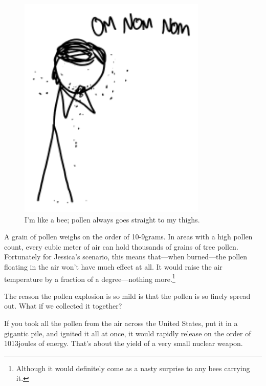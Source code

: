 {\begin{figure}[!htbp]
\centering
\includegraphics[scale=0.5, max width=0.8\textwidth]{imgs/a/97/eating.png}
\caption{I'm like a bee; pollen always goes straight to my thighs.}
\end{figure}

{A grain of pollen weighs on the order of 10-9grams. In areas with a high pollen count, every cubic meter of air can hold thousands of grains of tree pollen. Fortunately for Jessica's scenario, this means that—when burned—the pollen floating in the air won't have much effect at all. It would raise the air temperature by a fraction of a degree—nothing more.{\footnote{Although it would definitely come as a nasty surprise to any bees carrying it.} } }

{The reason the pollen explosion is so mild is that the pollen is so finely spread out. What if we collected it together?}

{If you took all the pollen from the air across the United States, put it in a gigantic pile, and ignited it all at once, it would rapidly release on the order of 1013joules of energy. That's about the yield of a very small nuclear weapon.}

}
